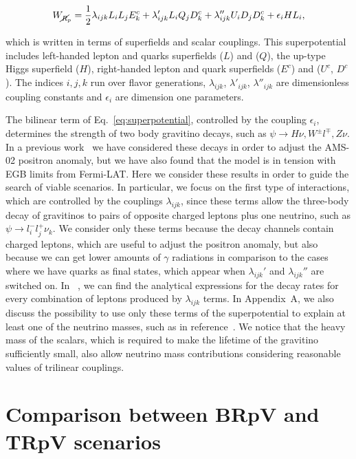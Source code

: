 \documentclass[a4paper,11pt]{article}
\begin{document}
\begin{equation}
 W_{\cancel{R}_p} =  \frac{1}{2}\lambda_{ijk}L_i L_j E_k^c + \lambda'_{ijk}L_i Q_j D_k^c + \lambda''_{ijk}U_i D_j D_k^c + \epsilon_iHL_i,
\label{eq:superpotential}
\end{equation}

\noindent which is written in terms of superfields and scalar couplings. This superpotential includes left-handed lepton and quarks superfields ($L$) and ($Q$), the up-type Higgs superfield ($H$), right-handed lepton and quark superfields ($E^c$) and ($U^c$, $D^c$). The indices $i,j,k$ run over flavor generations, $\lambda_{ijk}$, $\lambda'_{ijk}$, $\lambda''_{ijk}$ are dimensionless coupling constants and $\epsilon_i$ are dimension one parameters. 

The bilinear term of Eq.~\ref{eq:superpotential}, controlled by the coupling $\epsilon_i$, determines the strength of two body gravitino decays, such as $\psi\rightarrow H\nu, W^{\pm} l^{\mp}, Z\nu$. In a previous work~\cite{Carquin:2015uma} we have considered these decays in order to adjust the AMS-02 positron anomaly, but we have also found that the model is in tension with EGB limits from Fermi-LAT. Here we consider these results in order to guide the search of viable scenarios. In particular, we focus on the first type of interactions, which are controlled by the couplings $\lambda_{ijk}$, since these terms allow the three-body decay of gravitinos to pairs of opposite charged leptons plus one neutrino, such as $\psi  \rightarrow l^{-}_il^{+}_j\nu_k$. We consider only these terms because the decay channels contain charged leptons, which are useful to adjust the positron anomaly, but also because we can get lower amounts of $\gamma$ radiations in comparison to the cases where we have quarks as final states, which appear when $\lambda_{ijk}'$ and $\lambda_{ijk}''$ are switched on. In ~\cite{Moreau:2001sr}, we can find the analytical expressions for the decay rates for every combination of leptons produced by $\lambda_{ijk}$ terms. In Appendix~A, we also discuss the possibility to use only these terms of the superpotential to explain at least one of the neutrino masses, such as in reference~\cite{Chun:2004mu}. We notice that the heavy mass of the scalars, which is required to make the lifetime of the gravitino sufficiently small, also allow neutrino mass contributions considering reasonable values of trilinear couplings. 

\section{Comparison between BRpV and TRpV scenarios}
\label{sec:comparison}
\end{document}
